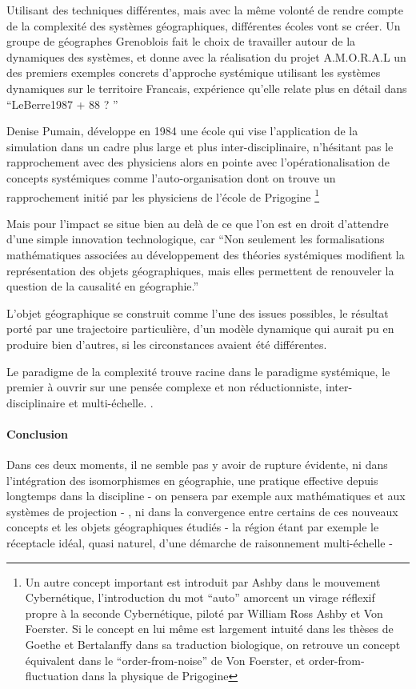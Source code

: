 Utilisant des techniques différentes, mais avec la même volonté de rendre compte de la complexité des systèmes géographiques, différentes écoles vont se créer. Un groupe de géographes Grenoblois fait le choix de travailler autour de la dynamiques des systèmes, et donne avec la réalisation du projet A.M.O.R.A.L \autocite{1984} un des premiers exemples concrets d'approche systémique utilisant les systèmes dynamiques sur le territoire Francais, expérience qu'elle relate plus en détail dans \enquote{LeBerre1987 + 88 ? }

Denise Pumain, développe en 1984 une école qui vise l'application de la simulation dans un cadre plus large et plus inter-disciplinaire, n'hésitant pas le rapprochement avec des physiciens alors en pointe avec l'opérationalisation de concepts systémiques comme l'auto-organisation dont on trouve un rapprochement initié par les physiciens de l'école de Prigogine \footnote{Un autre concept important est introduit par Ashby dans le mouvement Cybernétique, l'introduction du mot \enquote{auto} amorcent un virage réflexif propre à la seconde Cybernétique, piloté par William Ross Ashby et Von Foerster. Si le concept en lui même est largement intuité dans les thèses de Goethe et Bertalanffy \autocite[102]{Pouvreau2013} dans sa traduction biologique, on retrouve un concept équivalent dans le \enquote{order-from-noise} de Von Foerster, et order-from-fluctuation dans la physique de Prigogine} 

Mais pour \textcite[137]{Pumain2002} l'impact se situe bien au delà de ce que l'on est en droit d'attendre d'une simple innovation technologique, car \enquote{Non seulement les formalisations mathématiques associées au développement des théories systémiques modifient la représentation des objets géographiques, mais elles permettent de renouveler la question de la causalité en géographie.}

L’objet géographique se construit comme l’une des issues possibles, le résultat porté par une trajectoire particulière, d’un modèle dynamique qui
aurait pu en produire bien d’autres, si les circonstances avaient été différentes.


Le paradigme de la complexité trouve racine dans le paradigme systémique, le premier à ouvrir sur une pensée complexe et non réductionniste, inter-disciplinaire et multi-échelle.  \autocite{Rosnay1975}. 

\paragraph{Conclusion}
Dans ces deux moments, il ne semble pas y avoir de rupture évidente, ni dans l'intégration des isomorphismes en géographie, une pratique effective depuis longtemps dans la discipline - on pensera par exemple aux mathématiques et aux systèmes de projection - , ni dans la convergence entre certains de ces nouveaux concepts et les objets géographiques étudiés - la région étant par exemple le réceptacle idéal, quasi naturel, d'une démarche de raisonnement multi-échelle -



